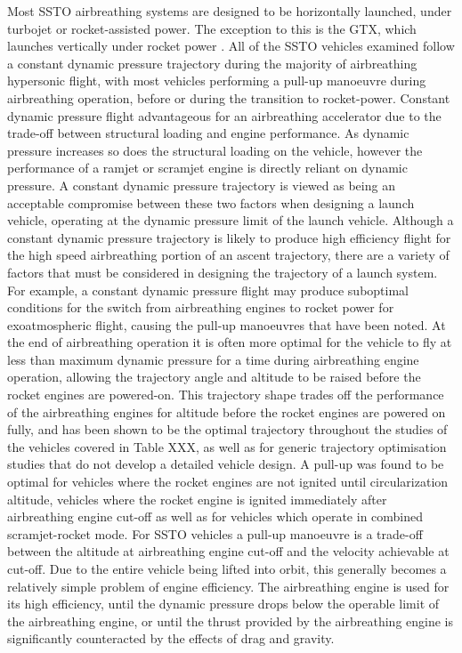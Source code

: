 Most SSTO airbreathing systems are designed to be horizontally launched, under turbojet or rocket-assisted power. The exception to this is the GTX, which launches vertically under rocket power\cite{Roche2000,Trefny1999} . 
All of the SSTO vehicles examined follow a constant dynamic pressure trajectory during the majority of airbreathing hypersonic flight, with most vehicles performing a pull-up manoeuvre during airbreathing operation, before or during the transition to rocket-power. 
Constant dynamic pressure flight advantageous for an airbreathing accelerator due to the trade-off between structural loading and engine performance\cite{Olds1998}. As dynamic pressure increases so does the structural loading on the vehicle, however the performance of a ramjet or scramjet engine is directly reliant on dynamic pressure\cite{Olds1998}. A constant dynamic pressure trajectory is viewed as being an acceptable compromise between these two factors when designing a launch vehicle, operating at the dynamic pressure limit of the launch vehicle. 
Although a constant dynamic pressure trajectory is likely to produce high efficiency flight for the high speed airbreathing portion of an ascent trajectory, there are a variety of factors that must be considered in designing the trajectory of a launch system. 
For example, a constant dynamic pressure flight may produce suboptimal conditions for the switch from airbreathing engines to rocket power for exoatmospheric flight, causing the pull-up manoeuvres that have been noted. 
At the end of airbreathing operation it is often more optimal for the vehicle to fly at less than maximum dynamic pressure for a time during airbreathing engine operation, allowing the trajectory angle and altitude to be raised before the rocket engines are powered-on. 
This trajectory shape trades off the performance of the airbreathing engines for altitude before the rocket engines are powered on fully, and has been shown to be the optimal trajectory throughout the studies of the vehicles covered in Table XXX\cite{Argus,Powell1991,Trefny1999,Roche2000,Pescetelli2012,Young2006,Bradford2000,Hyperion}, as well as for generic trajectory optimisation studies that do not develop a detailed vehicle design\cite{Pescetelli2012,Mooij,Lu1993}.
A pull-up was found to be optimal for vehicles where the rocket engines are not ignited until circularization altitude\cite{Powell1991,Lu1993}, vehicles where the rocket engine is ignited immediately after airbreathing engine cut-off\cite{Trefny1999,Roche2000,Pescetelli2012} as well as for vehicles which operate in combined scramjet-rocket mode\cite{Young2006,Bradford2000}.
For SSTO vehicles a pull-up manoeuvre is a trade-off between the altitude at airbreathing engine cut-off and the velocity achievable at cut-off. Due to the entire vehicle being lifted into orbit, this generally becomes a relatively simple problem of engine efficiency. The airbreathing engine is used for its high efficiency, until the dynamic pressure drops below the operable limit of the airbreathing engine, or until the thrust provided by the airbreathing engine is significantly counteracted by the effects of drag and gravity. 

